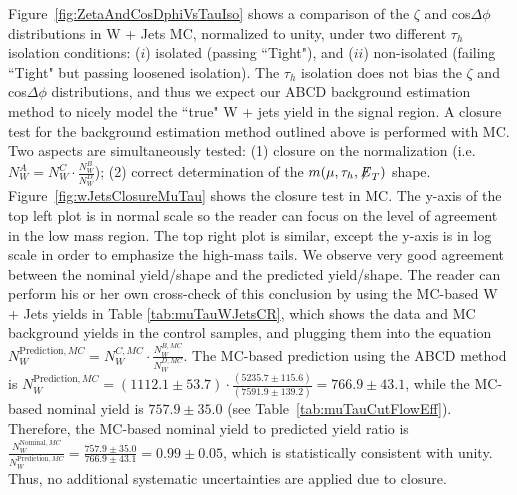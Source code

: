 Figure~\ref{fig:ZetaAndCosDphiVsTauIso} shows a comparison of the $\zeta$ and cos$\Delta\phi$ distributions in W + Jets MC, normalized to unity, under two 
different $\tau_{h}$ isolation conditions: ($i$) isolated (passing ``Tight"), and ($ii$) non-isolated (failing ``Tight" but passing loosened isolation). The 
$\tau_{h}$ isolation does not bias the $\zeta$ and cos$\Delta\phi$ distributions, and thus we expect our ABCD background estimation method to nicely model the ``true" W + 
jets yield in the signal region. A closure test for the background estimation method outlined above is performed with MC. Two aspects are simultaneously tested: 
(1) closure on the normalization (i.e. $N_{W}^{A} = N_{W}^{C} \cdot \frac{N_{W}^{B}}{N_{W}^{D}}$); (2) correct determination of the $m(\mu,\tau_{h},{\not\mathrel{E}}_T)$ shape. 
Figure~\ref{fig:wJetsClosureMuTau} shows the closure test in MC. The y-axis of the top left plot is in normal scale so the reader can focus on the level of 
agreement in the low mass region. The top right plot is similar, except the y-axis is in log scale in order to emphasize the high-mass tails. We observe very 
good agreement between the nominal yield/shape and the predicted yield/shape. The reader can perform his or her own cross-check of this conclusion by using the 
MC-based W + Jets yields in Table \ref{tab:muTauWJetsCR}, which shows the data and MC background yields in the control samples, and plugging them into the 
equation $N_{W}^{\textrm{Prediction},MC} = N_{W}^{C,MC} \cdot \frac{N_{W}^{B,MC}}{N_{W}^{D,MC}}$. The MC-based prediction using the ABCD method is 
$N_{W}^{\textrm{Prediction},MC} = (1112.1 \pm 53.7) \cdot \frac{(5235.7 \pm 115.6)}{(7591.9 \pm 139.2)} = 766.9 \pm 43.1$, while the MC-based nominal 
yield is $757.9 \pm 35.0$ (see Table~\ref{tab:muTauCutFlowEff}). Therefore, the MC-based nominal yield to predicted yield ratio is 
$\frac{N_{W}^{\textrm{Nominal},MC}}{N_{W}^{\textrm{Prediction},MC}} = \frac{757.9 \pm 35.0}{766.9 \pm 43.1} = 0.99 \pm 0.05$, which is statistically 
consistent with unity. 
Thus, no additional systematic uncertainties are applied due to closure.


